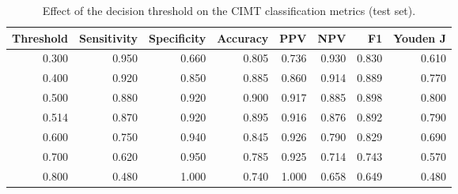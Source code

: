 \begin{table}
\caption{Effect of the decision threshold on the CIMT classification metrics (test set).}
\label{tab:threshold_sensitivity}
\begin{tabular}{rrrrrrrr}
\toprule
Threshold & Sensitivity & Specificity & Accuracy & PPV & NPV & F1 & Youden J \\
\midrule
0.300 & 0.950 & 0.660 & 0.805 & 0.736 & 0.930 & 0.830 & 0.610 \\
0.400 & 0.920 & 0.850 & 0.885 & 0.860 & 0.914 & 0.889 & 0.770 \\
0.500 & 0.880 & 0.920 & 0.900 & 0.917 & 0.885 & 0.898 & 0.800 \\
0.514 & 0.870 & 0.920 & 0.895 & 0.916 & 0.876 & 0.892 & 0.790 \\
0.600 & 0.750 & 0.940 & 0.845 & 0.926 & 0.790 & 0.829 & 0.690 \\
0.700 & 0.620 & 0.950 & 0.785 & 0.925 & 0.714 & 0.743 & 0.570 \\
0.800 & 0.480 & 1.000 & 0.740 & 1.000 & 0.658 & 0.649 & 0.480 \\
\bottomrule
\end{tabular}
\end{table}
